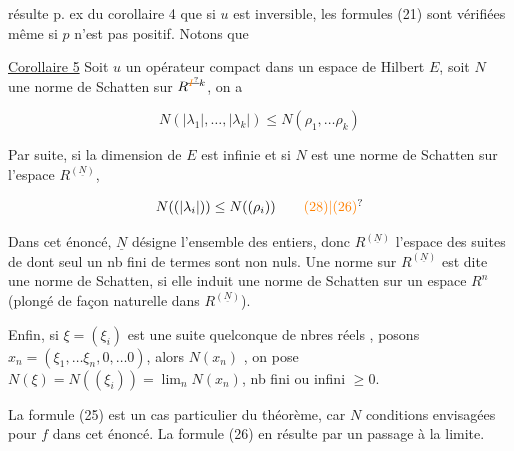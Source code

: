  résulte p. ex du corollaire 4 que si $u$ est inversible, les formules (21) sont vérifiées même si $p$ n'est pas positif. Notons que 


\uline{Corollaire 5} Soit $u$ un opérateur compact dans un espace de Hilbert $E$, soit $N$ une norme de Schatten sur $R^{\deleted{\unsure{I}}k}$,   on a

\[
N(|\lambda_1|,\ldots,|\lambda_k|)\leq N(\rho_1,\ldots\rho_k)\tag*{(27)}
\]

 Par suite, si la dimension de $E$ est infinie et si $N$ est une norme de Schatten sur  l'espace $R^{(\underline N)}$,  

\[
N((|\lambda_i|))\leq N((\rho_i))\tag*{\unsure{(28)|(26)}}
\]

Dans cet énoncé, $\underline N$ désigne l'ensemble des entiers, donc $R^{(\underline N)}$ l'espace des suites de   dont seul un nb fini de termes sont non nuls. Une norme sur $R^{(\underline N)}$ est dite une norme de Schatten, si elle induit une norme de Schatten sur  un espace $R^n$ (plongé de façon naturelle dans $R^{(\underline N)}$).


 Enfin, si $\xi=(\xi_i)$ est une suite quelconque de nbres réels , posons $x_n=(\xi_1,\ldots\xi_n,0,\ldots0)$, alors $N(x_n)$ ,  on pose $N(\xi)=N((\xi_i))=\lim_n N(x_n)$, nb fini ou infini $\geq0$.

 La formule (25) est un cas particulier du théorème, car $N$  conditions envisagées pour $f$ dans cet énoncé. La formule (26) en résulte par un passage à la limite.

